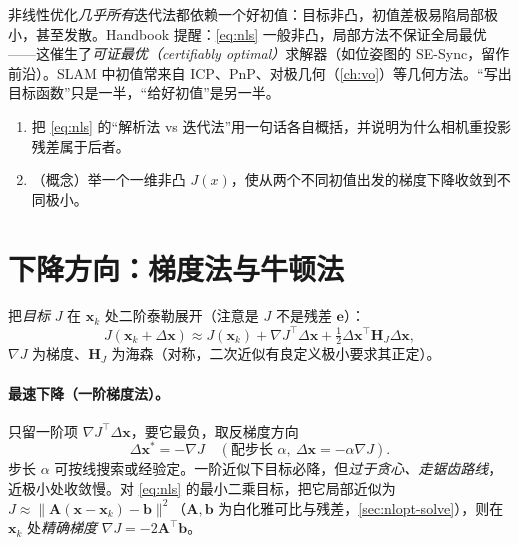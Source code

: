 \begin{pitfall}[初值决定成败]
非线性优化\emph{几乎所有}迭代法都依赖一个好初值\cite{gaoxiang2019slam14,carlone2026handbook}：目标非凸，初值差极易陷局部极小，甚至发散。Handbook\cite{carlone2026handbook} 提醒：\cref{eq:nls} 一般非凸，局部方法不保证全局最优——这催生了\emph{可证最优（certifiably optimal）}求解器（如位姿图的 SE-Sync，留作前沿）。SLAM 中初值常来自 ICP、PnP、对极几何（\cref{ch:vo}）等几何方法。“写出目标函数”只是一半，“给好初值”是另一半。
\end{pitfall}

\begin{practice}
\begin{enumerate}
  \item 把 \cref{eq:nls} 的“解析法 vs 迭代法”用一句话各自概括，并说明为什么相机重投影残差属于后者。
  \item （概念）举一个一维非凸 $J(x)$，使从两个不同初值出发的梯度下降收敛到不同极小。
\end{enumerate}
\end{practice}

\section{下降方向：梯度法与牛顿法}
\label{sec:nlopt-gradient}

把\emph{目标} $J$ 在 $\mathbf{x}_k$ 处二阶泰勒展开（注意是 $J$ 不是残差 $\mathbf{e}$）\cite{gaoxiang2019slam14,barfoot2024state}：
\begin{equation}
  J(\mathbf{x}_k+\Delta\mathbf{x})\approx J(\mathbf{x}_k)+\nabla J^\top\Delta\mathbf{x}+\tfrac12\Delta\mathbf{x}^\top\mathbf{H}_J\Delta\mathbf{x},
  \label{eq:taylor-J}
\end{equation}
$\nabla J$ 为梯度、$\mathbf{H}_J$ 为海森（对称，二次近似有良定义极小要求其正定）。

\paragraph{最速下降（一阶梯度法）。}
只留一阶项 $\nabla J^\top\Delta\mathbf{x}$，要它最负，取反梯度方向
\begin{equation}
  \Delta\mathbf{x}^*=-\nabla J\quad(\text{配步长 }\alpha,\ \Delta\mathbf{x}=-\alpha\nabla J).
  \label{eq:nlopt-sd}
\end{equation}
步长 $\alpha$ 可按线搜索或经验定\cite{gaoxiang2019slam14}。一阶近似下目标必降，但\emph{过于贪心、走锯齿路线}，近极小处收敛慢。对 \cref{eq:nls} 的最小二乘目标，把它局部近似为 $J\approx\|\mathbf{A}(\mathbf{x}-\mathbf{x}_k)-\mathbf{b}\|^2$（$\mathbf{A},\mathbf{b}$ 为白化雅可比与残差，\cref{sec:nlopt-solve}），则在 $\mathbf{x}_k$ 处\emph{精确梯度} $\nabla J=-2\mathbf{A}^\top\mathbf{b}$\cite{carlone2026handbook}。

